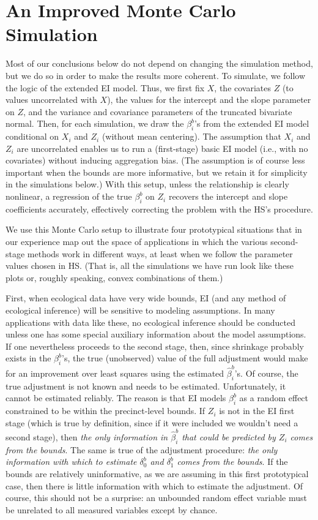 \documentclass[11pt,titlepage]{article}
\begin{document}
\section{An Improved Monte Carlo Simulation} \label{s:alt}

Most of our conclusions below do not depend on changing the simulation
method, but we do so in order to make the results more coherent.  To
simulate, we follow the logic of the extended EI model.  Thus, we
first fix $X$, the covariates $Z$ (to values uncorrelated with $X$),
the values for the intercept and the slope parameter on $Z$, and the
variance and covariance parameters of the truncated bivariate normal.
Then, for each simulation, we draw the $\beta_i^b$'s from the extended
EI model conditional on $X_i$ and $Z_i$ (without mean centering).  The
assumption that $X_i$ and $Z_i$ are uncorrelated enables us to run a
(first-stage) basic EI model (i.e., with no covariates) without
inducing aggregation bias.  (The assumption is of course less
important when the bounds are more informative, but we retain it for
simplicity in the simulations below.)  With this setup, unless the
relationship is clearly nonlinear, a regression of the true
$\beta_i^b$ on $Z_i$ recovers the intercept and slope coefficients
accurately, effectively correcting the problem with the HS's
procedure.

We use this Monte Carlo setup to illustrate four prototypical
situations that in our experience map out the space of applications in
which the various second-stage methods work in different ways, at
least when we follow the parameter values chosen in HS.  (That is, all
the simulations we have run look like these plots or, roughly
speaking, convex combinations of them.)

First, when ecological data have very wide bounds, EI (and any method
of ecological inference) will be sensitive to modeling assumptions.
In many applications with data like these, no ecological inference
should be conducted unless one has some special auxiliary information
about the model assumptions.  If one nevertheless proceeds to the
second stage, then, since shrinkage probably exists in the
$\beta_i^b$'s, the true (unobserved) value of the full adjustment
would make for an improvement over least squares using the estimated
$\hat\beta_i^b$'s.  Of course, the true adjustment is not known and
needs to be estimated.  Unfortunately, it cannot be estimated
reliably.  The reason is that EI models $\beta_i^b$ as a random effect
constrained to be within the precinct-level bounds. If $Z_i$ is not in
the EI first stage (which is true by definition, since if it were
included we wouldn't need a second stage), then \emph{the only
  information in $\hat\beta_i^b$ that could be predicted by $Z_i$
  comes from the bounds}.  The same is true of the adjustment
procedure: \emph{the only information with which to estimate
  $\delta_0^b$ and $\delta_1^b$ comes from the bounds}.  If the bounds
are relatively uninformative, as we are assuming in this first
prototypical case, then there is little information with which to
estimate the adjustment.  Of course, this should not be a surprise: an
unbounded random effect variable must be unrelated to all measured
variables except by chance.
\end{document}
